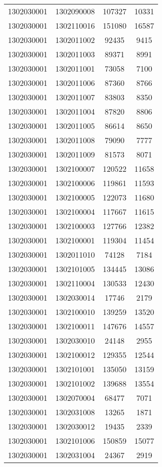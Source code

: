 \begin{longtable}{llcc}
1302030001 & 1302090008 & 107327 & 10331\\
1302030001 & 1302110016 & 151080 & 16587\\
1302030001 & 1302011002 & 92435 & 9415\\
1302030001 & 1302011003 & 89371 & 8991\\
1302030001 & 1302011001 & 73058 & 7100\\
1302030001 & 1302011006 & 87360 & 8766\\
1302030001 & 1302011007 & 83803 & 8350\\
1302030001 & 1302011004 & 87820 & 8806\\
1302030001 & 1302011005 & 86614 & 8650\\
1302030001 & 1302011008 & 79090 & 7777\\
1302030001 & 1302011009 & 81573 & 8071\\
1302030001 & 1302100007 & 120522 & 11658\\
1302030001 & 1302100006 & 119861 & 11593\\
1302030001 & 1302100005 & 122073 & 11680\\
1302030001 & 1302100004 & 117667 & 11615\\
1302030001 & 1302100003 & 127766 & 12382\\
1302030001 & 1302100001 & 119304 & 11454\\
1302030001 & 1302011010 & 74128 & 7184\\
1302030001 & 1302101005 & 134445 & 13086\\
1302030001 & 1302110004 & 130533 & 12430\\
1302030001 & 1302030014 & 17746 & 2179\\
1302030001 & 1302100010 & 139259 & 13520\\
1302030001 & 1302100011 & 147676 & 14557\\
1302030001 & 1302030010 & 24148 & 2955\\
1302030001 & 1302100012 & 129355 & 12544\\
1302030001 & 1302101001 & 135050 & 13159\\
1302030001 & 1302101002 & 139688 & 13554\\
1302030001 & 1302070004 & 68477 & 7071\\
1302030001 & 1302031008 & 13265 & 1871\\
1302030001 & 1302030012 & 19435 & 2339\\
1302030001 & 1302101006 & 150859 & 15077\\
1302030001 & 1302031004 & 24367 & 2919\\

\end{longtable}
